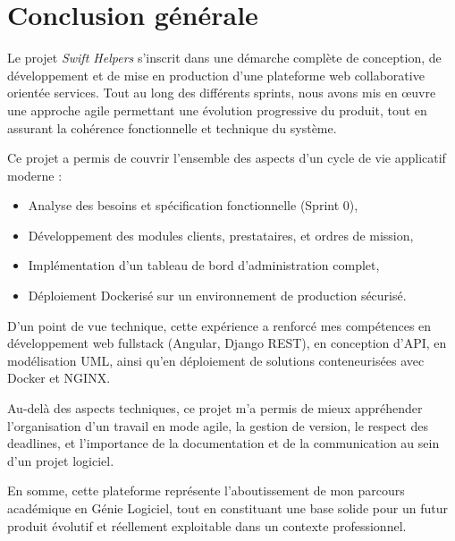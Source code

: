 \chapter*{Conclusion générale}

Le projet \textit{Swift Helpers} s’inscrit dans une démarche complète de conception, de développement et de mise en production d’une plateforme web collaborative orientée services. Tout au long des différents sprints, nous avons mis en œuvre une approche agile permettant une évolution progressive du produit, tout en assurant la cohérence fonctionnelle et technique du système.

Ce projet a permis de couvrir l’ensemble des aspects d’un cycle de vie applicatif moderne :
\begin{itemize}
    \item Analyse des besoins et spécification fonctionnelle (Sprint 0),
    \item Développement des modules clients, prestataires, et ordres de mission,
    \item Implémentation d’un tableau de bord d’administration complet,
    \item Déploiement Dockerisé sur un environnement de production sécurisé.
\end{itemize}

D’un point de vue technique, cette expérience a renforcé mes compétences en développement web fullstack (Angular, Django REST), en conception d’API, en modélisation UML, ainsi qu’en déploiement de solutions conteneurisées avec Docker et NGINX.

Au-delà des aspects techniques, ce projet m’a permis de mieux appréhender l’organisation d’un travail en mode agile, la gestion de version, le respect des deadlines, et l’importance de la documentation et de la communication au sein d’un projet logiciel.

En somme, cette plateforme représente l’aboutissement de mon parcours académique en Génie Logiciel, tout en constituant une base solide pour un futur produit évolutif et réellement exploitable dans un contexte professionnel.
